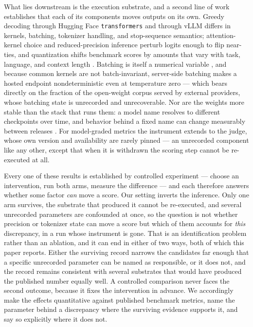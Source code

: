 What lies downstream is the execution substrate, and a second line of work establishes that each of its components moves outputs on its own. Greedy decoding through Hugging Face \texttt{transformers} \citep{wolf2020transformers} and through vLLM \citep{kwon2023vllm} differs in kernels, batching, tokenizer handling, and stop-sequence semantics; attention-kernel choice \citep{dao2022flashattention} and reduced-precision inference \citep{dettmers2022int8} perturb logits enough to flip near-ties, and quantization shifts benchmark scores by amounts that vary with task, language, and context length \citep{mekala2025doesquantizationaffectmodels,marchisio2024doesquantizationaffectmultilingual,shi2025systematiccharacterizationllmquantization,shen2024exploring}. Batching is itself a numerical variable \citep{yuan2026understanding}, and because common kernels are not batch-invariant, server-side batching makes a hosted endpoint nondeterministic even at temperature zero \citep{thinkingmachines2025nondeterminism,atil2024nondeterminism} --- which bears directly on the fraction of the open-weight corpus served by external providers, whose batching state is unrecorded and unrecoverable. Nor are the weights more stable than the stack that runs them: a model name resolves to different checkpoints over time, and behavior behind a fixed name can change measurably between releases \citep{chen2023chatgpt}. For model-graded metrics the instrument extends to the judge, whose own version and availability are rarely pinned \citep{zheng2023judge} --- an unrecorded component like any other, except that when it is withdrawn the scoring step cannot be re-executed at all.

Every one of these results is established by controlled experiment --- choose an intervention, run both arms, measure the difference --- and each therefore answers whether some factor \emph{can} move a score. Our setting inverts the inference. Only one arm survives, the substrate that produced it cannot be re-executed, and several unrecorded parameters are confounded at once, so the question is not whether precision or tokenizer state can move a score but which of them accounts for \emph{this} discrepancy, in a run whose instrument is gone. That is an identification problem rather than an ablation, and it can end in either of two ways, both of which this paper reports. Either the surviving record narrows the candidates far enough that a specific unrecorded parameter can be named as responsible, or it does not, and the record remains consistent with several substrates that would have produced the published number equally well. A controlled comparison never faces the second outcome, because it fixes the intervention in advance. We accordingly make the effects quantitative against published benchmark metrics, name the parameter behind a discrepancy where the surviving evidence supports it, and say so explicitly where it does not.

